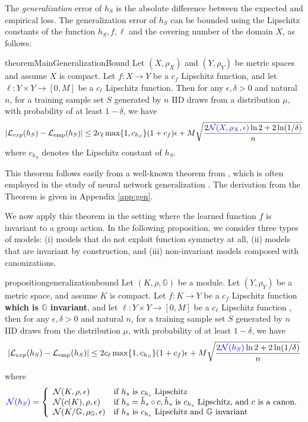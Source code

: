 \documentclass{article}
\theoremstyle{definition}
\theoremstyle{plain}
\newcommand{\G}{\mathbb{G}}
\newcommand{\N}{\mathcal{N}}
\newcommand{\Lemp}{\mathcal{L}_{\mathrm{emp}}}
\newcommand{\threepartdef}[6]
{
	\left\{
		\begin{array}{lll}
			#1 & \mbox{if } #2 \\
			#3 & \mbox{if } #4 \\
			#5 & \mbox{if } #6
		\end{array}
	\right.
}
\begin{document}
The \emph{generalization} error of $h_S$ is the absolute difference between the expected and empirical loss. The generalization error of $h_S$ can be bounded using the Lipschitz constants of the function  $h_S,f,\ell$ and the covering number of the domain $X$, as follows:

\begin{restatable}{theorem}{MainGeneralizationBound}
\label{thm:MainGeneralizationBound}
Let $(X,\rho_X) $ and $(Y,\rho_Y) $ be  metric spaces and assume $X$ is compact. Let $f:X\to Y $ be a $c_f$  Lipschitz function, and let $\ell:Y\times Y \to [0,M] $ be a $c_\ell $ Lipschitz function. Then for any $\epsilon,\delta>0$ and natural $n$,  for a training sample set $S$ generated by $n$ IID draws from a distribution $\mu$,  with probability of at least $ 1-\delta$, we have 
$$|\mathcal{L}_{exp}(h_S) - \Lemp(h_S)| \le 2c_\ell \max\{1,c_{h_S} \} (1+c_f)\epsilon+M \sqrt{\frac{2\textcolor{blue}{\mathcal{N}( X, \rho_X,\epsilon)}\ln 2 + 2 \ln(1/\delta)}{n}}$$
where $c_{h_S}$ denotes the Lipschitz constant of $h_S$.
\end{restatable}

This theorem follows easily from a well-known theorem from \cite{xu_robustness_2012}, which is often employed in the study of neural network generalization  \cite{vasileiou2025survey}.  The derivation from the Theorem is given in Appendix \ref{app:gen}.  

We now apply this theorem in the setting where the learned function $f$ is invariant to a group action. In the following proposition, we consider three types of models: (i) models that do not exploit function symmetry at all, (ii) models that are invariant by construction, and (iii) non-invariant models composed with canonizations. 

\begin{restatable}{proposition}{generalizationbound}
\label{propGen}
Let $(K,\rho,\G)$ be a module. Let  $(Y,\rho_Y) $ be a metric space, and assume $K$ is compact. Let $f:K\to Y $ be a $c_f$  Lipschitz function \textbf{which is $\G $ invariant}, and let $\ell:Y\times Y \to [0,M] $ be a $c_\ell $ Lipschitz function , then for any $\epsilon,\delta>0$ and natural $n$,  for a training sample set $S$ generated by $n$ IID draws from the distribution $\mu$,  with probability of at least $ 1-\delta$, we have 
$$|\mathcal{L}_{exp}(h_S) - \Lemp(h_S)| \le 2c_\ell \max\{1,c_{h_S} \} (1+c_f)\epsilon+M \sqrt{\frac{2\textcolor{blue}{\N(h_S)} \ln 2 + 2 \ln(1/\delta)}{n}}$$

where 
\begin{equation}\label{eq:differentN}
\textcolor{blue}{\N(h_S)}=\threepartdef{\N(K,\rho,\epsilon)}{h_s \text{ is } c_{h_s} \text{ Lipschitz }}{\N(c(K),\rho,\epsilon)}{h_s=\tilde{h}_s\circ c, \tilde{h}_s \text { is } c_{h_s} \text{ Lipschitz, and }  c \text{ is a canon.}} {\N(K/\G,\rho_{\G},\epsilon)}{h_s \text{ is } c_{h_s} \text{ Lipschitz and  } \G \text{ invariant }} 
\end{equation}
\end{restatable}
\end{document}

